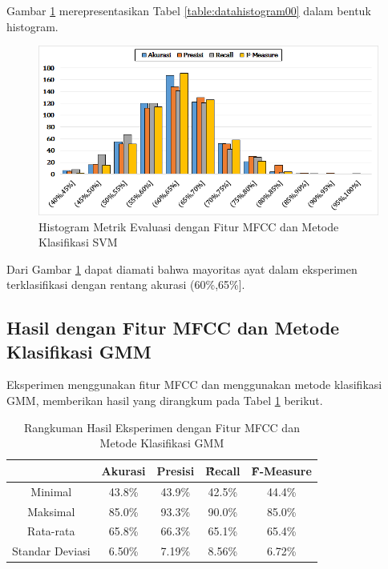   Gambar \ref{fig:histogram00} merepresentasikan Tabel \ref{table:datahistogram00} dalam bentuk histogram.
  \begin{figure}
    \centering
    \includegraphics[width=\linewidth]{pics/histogram00}
    \caption{Histogram Metrik Evaluasi dengan Fitur MFCC dan Metode Klasifikasi SVM}
    \label{fig:histogram00}
  \end{figure}

  Dari Gambar \ref{fig:histogram00} dapat diamati bahwa mayoritas ayat dalam eksperimen terklasifikasi dengan rentang akurasi (60\%,65\%].




  \subsection{Hasil dengan Fitur MFCC dan Metode Klasifikasi GMM}
  Eksperimen menggunakan fitur MFCC dan menggunakan metode klasifikasi GMM, memberikan hasil yang dirangkum pada Tabel \ref{table:mfccgmm} berikut.

  \begin{table}
    \centering
    \caption{Rangkuman Hasil Eksperimen dengan Fitur MFCC dan Metode Klasifikasi GMM}
    \begin{tabular}{|c|c|c|c|c|}
      \hline
       & Akurasi & Presisi & \f{\f{Recall}} & \f{\f{F-Measure}} \\ \hline
      Minimal         & 43.8\% & 43.9\% & 42.5\% & 44.4\% \\ \hline
      Maksimal        & 85.0\% & 93.3\% & 90.0\% & 85.0\% \\ \hline
      Rata-rata       & 65.8\% & 66.3\% & 65.1\% & 65.4\% \\ \hline
      Standar Deviasi & 6.50\% & 7.19\% & 8.56\% & 6.72\%  \\ \hline
    \end{tabular}
    \label{table:mfccgmm}
  \end{table}

